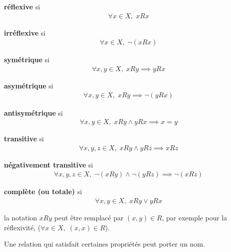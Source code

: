 \documentclass[a4paper, 12pt]{article}
\begin{document}
\begin{proprietes}
\item {
    \textbf{réflexive} si
    \begin{align*}
        \forall x \in X, \; xRx
    \end{align*}
}
\item {
    \textbf{irréflexive} si
    \begin{align*}
        \forall x \in X, \; \neg(xRx)
    \end{align*}
}
\item {
    \textbf{symétrique} si
    \begin{align*}
        \forall x, y \in X, \; xRy \implies yRx
    \end{align*}
}
\item {
    \textbf{asymétrique} si
    \begin{align*}
        \forall x, y \in X, \; xRy \implies \neg(yRx)
    \end{align*}
}
\item {
    \textbf{antisymétrique} si
    \begin{align*}
        \forall x, y \in X, \; xRy \land yRx \implies x = y
    \end{align*}
}
\item {
    \textbf{transitive} si
    \begin{align*}
        \forall x, y, z \in X, \; xRy \land yRz \implies xRz
    \end{align*}
}
\item {
    \textbf{négativement transitive} si
    \begin{align*}
        \forall x, y, z \in X, \; \neg(xRy) \land \neg(yRz) \implies \neg(xRz)
    \end{align*}
}\item {
    \textbf{complète (ou totale)} si
    \begin{align*}
        \forall x, y \in X, \; xRy \lor yRx
    \end{align*}
}
\end{proprietes}

\begin{remark}
    la notation $xRy$ peut être remplacé par $(x, y) \in R$, par exemple pour la réflexivité, ($\forall x \in X, \; (x, x) \in R$).
\end{remark}

\vspace{2em}

Une relation qui satisfait certaines propriétés peut porter un nom.
\end{document}
